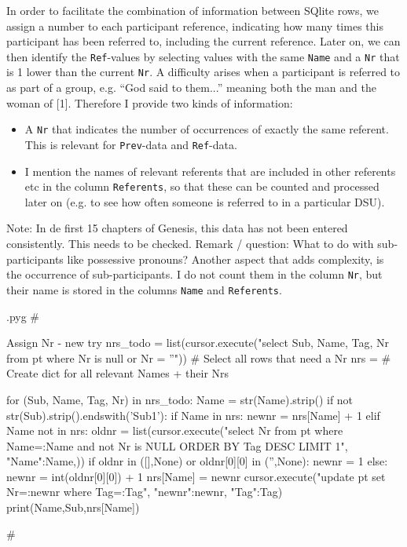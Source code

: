 \documentclass{report}
\makeatletter
\newcommand{\mi}[1]{\lstinline{#1}}
\newenvironment{python}{%
  \VerbatimEnvironment
  \minted@resetoptions
  \setkeys{minted@opt}{}
      \begin{VerbatimOut}{\jobname.pyg}}
{%
      \end{VerbatimOut}
      \minted@pygmentize{python}
      \DeleteFile{\jobname.pyg}}
\makeatother
\begin{document}
In order to facilitate the combination of information between SQlite rows,
we assign a number to each participant reference, indicating how many times
this participant has been referred to, including the current reference.
Later on, we can then identify the \mi{Ref}-values by selecting values with the
same \mi{Name} and a \mi{Nr} that is 1 lower than the current \mi{Nr}.
A difficulty arises when a participant is referred to as part of a group,
e.g. ``God said to them...'' meaning both the man and the woman of [1].
Therefore I provide two kinds of information:
\begin{itemize}
\item A \mi{Nr} that indicates the number of occurrences of exactly the same referent. This is relevant for \mi{Prev}-data and \mi{Ref}-data.
\item I mention the names of relevant referents that are included in other referents etc in the column \mi{Referents}, so that these can be counted and processed later on (e.g. to see how often someone is referred to in a particular DSU).
\end{itemize}
Note: In de first 15 chapters of Genesis, this data has not been entered consistently. This needs to be checked.
Remark / question: What to do with sub-participants like possessive pronouns?
Another aspect that adds complexity, is the occurrence of sub-participants.
I do not count them in the column \mi{Nr}, but their name is stored in the columns
\mi{Name} and \mi{Referents}.


\begin{python}
#{{{ Assign Nr - new try
nrs_todo = list(cursor.execute("select Sub, Name, Tag, Nr from pt where Nr is null or Nr = ''"))  # Select all rows that need a Nr
nrs = {}    # Create dict for all relevant Names + their Nrs

for (Sub, Name, Tag, Nr) in nrs_todo:
    Name = str(Name).strip()
    if not str(Sub).strip().endswith('Sub1'):
        if Name in nrs:
            newnr = nrs[Name] + 1
        elif Name not in nrs:
            oldnr = list(cursor.execute("select Nr from pt where Name=:Name and not Nr is NULL ORDER BY Tag DESC LIMIT 1", {"Name":Name,}))
            if oldnr in ([],None) or oldnr[0][0] in ('',None):
                newnr = 1
            else:
                newnr = int(oldnr[0][0]) + 1
        nrs[Name] = newnr
        cursor.execute("update pt set Nr=:newnr where Tag=:Tag", {"newnr":newnr, "Tag":Tag})
        print(Name,Sub,nrs[Name])

#}}}
\end{python}
\end{document}
